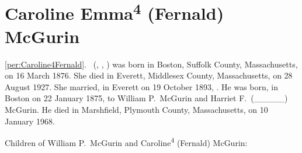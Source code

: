 \section{Caroline Emma\textsuperscript{4} (Fernald) McGurin}

\ref{per:Caroline4Fernald}.\  (, , ) was born in Boston, Suffolk County, Massachusetts, on 16 March 1876.\cite{Caroline4FernaldBirth} She died in Everett, Middlesex County, Massachusetts, on 28 August 1927.\cite{Caroline4FernaldDeath} She married, in Everett on 19 October 1893, . He was born, in Boston on 22 January 1875, to William P.\ McGurin and Harriet F.\ (\_\_\_\_\_) McGurin.\cite{JohnMcGurinBirth} He died in Marshfield, Plymouth County, Massachusetts, on 10 January 1968.\cite{JohnMcGurinDeath}

\begin{KidsIntro}
	Children of William P.\ McGurin and Caroline\textsuperscript{4} (Fernald) McGurin:
\end{KidsIntro}

